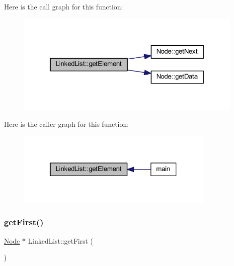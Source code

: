 Here is the call graph for this function\+:
\nopagebreak
\begin{figure}[H]
\begin{center}
\leavevmode
\includegraphics[width=311pt]{class_linked_list_a2866982bfe5f87a2a265d1e2ec3e43ed_cgraph}
\end{center}
\end{figure}
Here is the caller graph for this function\+:
\nopagebreak
\begin{figure}[H]
\begin{center}
\leavevmode
\includegraphics[width=270pt]{class_linked_list_a2866982bfe5f87a2a265d1e2ec3e43ed_icgraph}
\end{center}
\end{figure}
\mbox{\label{class_linked_list_a744fc291de7eff0b934e7b594449fa10}} 
\subsubsection{\texorpdfstring{get\+First()}{getFirst()}}
{\footnotesize\ttfamily \hyperlink{class_node}{Node} $\ast$ Linked\+List\+::get\+First (\begin{DoxyParamCaption}{ }\end{DoxyParamCaption})\hspace{0.3cm}{\ttfamily [inline]}}

